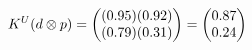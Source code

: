 \documentclass[preview]{standalone}
\begin{document}
\begin{align*}
\special{dvisvgm:raw <g id='unique000'>}K^U(d \otimes p) = \begin{pmatrix} (0.95)(0.92) \\ (0.79)(0.31) \end{pmatrix} = \begin{pmatrix} 0.87 \\ 0.24 \end{pmatrix}\special{dvisvgm:raw </g>}
\end{align*}
\end{document}
